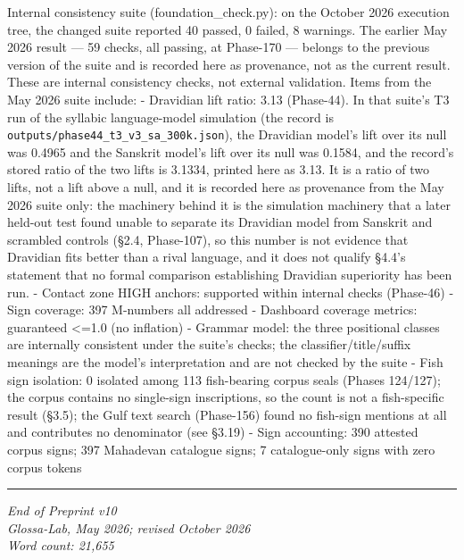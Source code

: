 \documentclass[
]{article}
\begin{document}
Internal consistency suite (foundation\_check.py): on the October 2026 execution tree, the changed suite reported 40 passed, 0 failed, 8 warnings. The earlier May 2026 result --- 59 checks, all passing, at Phase-170 --- belongs to the previous version of the suite and is recorded here as provenance, not as the current result. These are internal consistency checks, not external validation. Items from the May 2026 suite include: -
Dravidian lift ratio: 3.13 (Phase-44). In that suite's T3 run of the syllabic language-model simulation (the record is \texttt{outputs/phase44\_t3\_v3\_sa\_300k.json}), the Dravidian model's lift over its null was 0.4965 and the Sanskrit model's lift over its null was 0.1584, and the record's stored ratio of the two lifts is 3.1334, printed here as 3.13. It is a ratio of two lifts, not a lift above a null, and it is recorded here as provenance from the May 2026 suite only: the machinery behind it is the simulation machinery that a later held-out test found unable to separate its Dravidian model from Sanskrit and scrambled controls (§2.4, Phase-107), so this number is not evidence that Dravidian fits better than a rival language, and it does not qualify §4.4's statement that no formal comparison establishing Dravidian superiority has been run. - Contact zone
HIGH anchors: supported within internal checks (Phase-46) - Sign coverage: 397 M-numbers all
addressed - Dashboard coverage metrics: guaranteed \textless{}=1.0 (no inflation) -
Grammar model: the three positional classes are internally consistent under the suite's checks; the classifier/title/suffix meanings are the model's interpretation and are not checked by the suite - Fish sign isolation: 0 isolated among 113 fish-bearing corpus seals (Phases 124/127); the corpus contains no single-sign inscriptions, so the count is not a fish-specific result (§3.5); the Gulf text search (Phase-156) found no fish-sign mentions at all and contributes no denominator (see §3.19)
- Sign accounting: 390 attested corpus signs; 397 Mahadevan catalogue signs; 7 catalogue-only signs with zero corpus tokens

\begin{center}\rule{0.5\linewidth}{0.5pt}\end{center}

\emph{End of Preprint v10}\\
\emph{Glossa-Lab, May 2026; revised October 2026}\\
\emph{Word count: 21,655}
\end{document}
